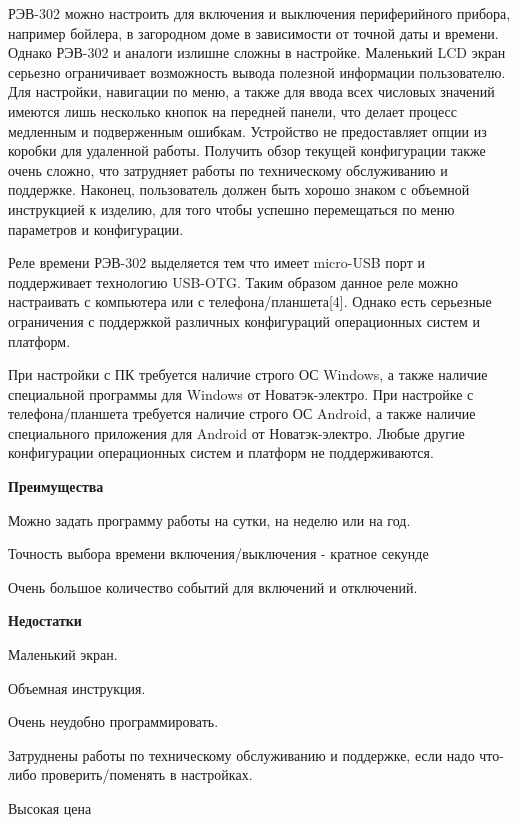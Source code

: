 РЭВ-302 можно настроить для включения и выключения периферийного прибора, например бойлера, в загородном доме в зависимости от точной даты и времени. Однако РЭВ-302 и аналоги излишне сложны в настройке.  Маленький LCD экран серьезно ограничивает возможность вывода полезной информации пользователю. Для настройки, навигации по меню, а также для ввода всех числовых значений имеются лишь несколько кнопок на передней панели, что делает процесс медленным и подверженным ошибкам. Устройство не предоставляет опции из коробки для удаленной работы. Получить обзор текущей конфигурации также очень сложно, что затрудняет работы по техническому обслуживанию и поддержке. Наконец, пользователь должен быть хорошо знаком с объемной инструкцией к изделию, для того чтобы успешно перемещаться по меню параметров и конфигурации. 

Реле времени РЭВ-302 выделяется тем что имеет micro-USB порт и поддерживает технологию USB-OTG. Таким образом данное реле можно настраивать с компьютера или с телефона/планшета[4]. Однако есть серьезные ограничения с поддержкой различных конфигураций операционных систем и платформ.

При настройки с ПК требуется наличие строго ОС Windows, а также наличие специальной программы для Windows от Новатэк-электро. При настройке с телефона/планшета требуется наличие строго ОС Android, а также наличие специального приложения для Android от Новатэк-электро. Любые другие конфигурации операционных систем и платформ не поддерживаются.

\textbf{Преимущества}
\begin{my_enumerate}
\item Можно задать программу работы на сутки, на неделю или на год.
\item Точность выбора времени включения/выключения - кратное секунде
\item Очень большое количество событий для включений и отключений.
\end{my_enumerate}

\textbf{Недостатки}
\begin{my_enumerate}
\item Маленький экран.
\item Объемная инструкция.
\item Очень неудобно программировать.
\item Затруднены работы по техническому обслуживанию и поддержке, если надо что-либо проверить/поменять в настройках.
\item Высокая цена
\end{my_enumerate}


